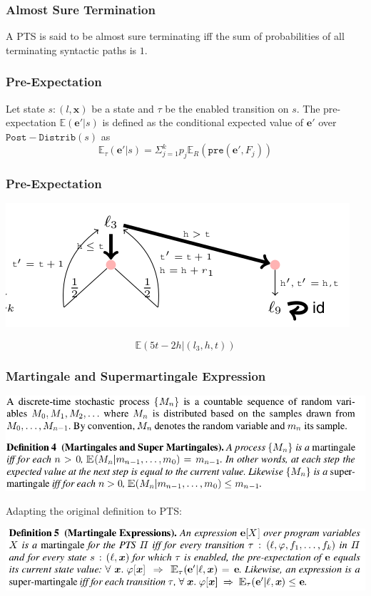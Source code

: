 \documentclass[11pt]{beamer}
\begin{document}
\begin{frame}\frametitle{Almost Sure Termination}
\begin{definition}[a.s. Termination]
A PTS is said to be almost sure terminating iff the sum of probabilities of all  terminating syntactic paths is $1$.
\end{definition}
\end{frame}
\begin{frame}\frametitle{Pre-Expectation}
\begin{definition}
Let state $s:(l,\mathbf{x})$ be a state and $\tau$ be the enabled transition on $s$. The pre-expectation $\mathbb{E}(\mathbf{e}'|s)$ is defined as the conditional expected value of $\mathbf{e}'$ over $\mathtt{Post-Distrib}(s)$ as 
\[\mathbb{E}_\tau(\mathbf{e}'|s) = \Sigma_{j = 1}^k p_j\mathbb{E}_R(\mathtt{pre}(\mathbf{e}', F_j))\]
\end{definition}
\end{frame}

\begin{frame}\frametitle{Pre-Expectation}
\begin{center}
\includegraphics[scale=0.4]{def1exp.png}
\end{center}
\begin{example}
\[\mathbb{E}(5t-2h|(l_3, h, t))\]

\end{example}

\end{frame}

\begin{frame}\frametitle{Martingale and Supermartingale Expression}
\begin{center}
\includegraphics[scale=0.35]{def:martingale.png}
\end{center}
Adapting the original definition to PTS:
\begin{center}
\includegraphics[scale=0.35]{def:martingaleexp.png}
\end{center}
\end{frame}
\end{document}
